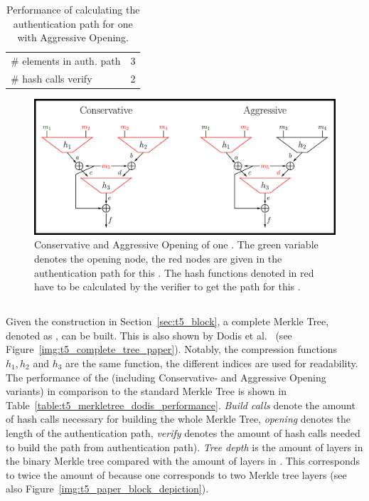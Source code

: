 \begin{table}
\centering
\begin{tabular}{l c} 
 \hline\noalign{\smallskip}
 \multicolumn{2}{c}{\textbf{Aggressive Opening}} \\
 \hline\noalign{\smallskip}
 \# elements in auth. path & 3 \\
 \# hash calls verify & 2 \\
 \hline
\end{tabular}
\caption{Performance of calculating the authentication path for one \tfblock with Aggressive Opening.}
\label{table:aggr_opening}
\end{table}



\begin{figure}
\centering
\includegraphics[]{images/Methods/aggr_conserv_opening_T5.png}
\caption{Conservative and Aggressive Opening of one \tfblock. The green variable denotes the opening node, the red nodes are given in the authentication path for this \tfblock. The hash functions denoted in red have to be calculated by the verifier to get the path for this \tfblock.~\cite{T5_paper}}
\label{img:t5_conserv_aggr_opening}
\end{figure}

\subsection{\texorpdfstring{\tftree}{T5 Merkle Tree}}
\label{sec:dodis_t5_merkle_tree}
Given the \tfblock construction in Section~\ref{sec:t5_block}, a complete \tf Merkle Tree, denoted as \textit{\tftree}, can be built. This is also shown by Dodis et al.~\cite{T5_paper} (see Figure~\ref{img:t5_complete_tree_paper}). Notably, the compression functions $h_1, h_2$ and $h_3$ are the same function, the different indices are used for readability. The performance of the \tftree (including Conservative- and Aggressive Opening variants) in comparison to the standard Merkle Tree is shown in Table~\ref{table:t5_merkletree_dodis_performance}. \textit{Build calls} denote the amount of hash calls necessary for building the whole \tf Merkle Tree, \textit{opening} denotes the length of the authentication path, \textit{verify} denotes the amount of hash calls needed to build the path from authentication path). 
\textit{Tree depth} is the amount of layers in the binary Merkle tree compared with the amount of layers in \tftree. 
This corresponds to twice the amount of \tfblocks because one \tfblock corresponds to two Merkle tree layers (see also Figure~\ref{img:t5_paper_block_depiction}).

